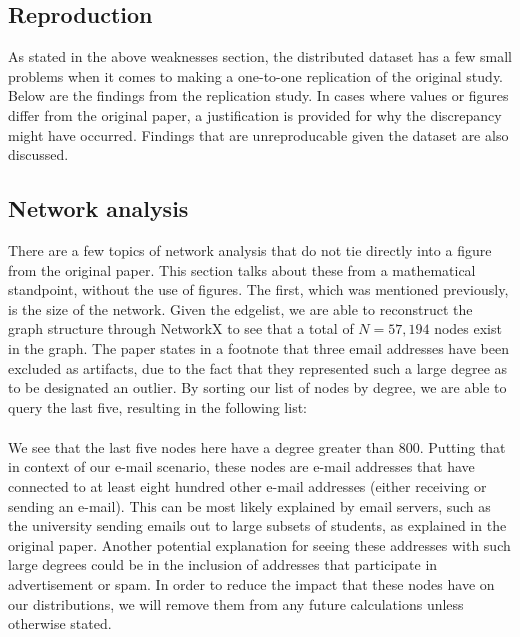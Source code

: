 \documentclass[11pt]{article}
\begin{document}
\begin{multicols}{2}
\section{Reproduction}
\hspace*{\parindent}As stated in the above weaknesses section, the distributed dataset has a few small problems when it comes to making a one-to-one replication of the original study. Below are the findings from the replication study. In cases where values or figures differ from the original paper, a justification is provided for why the discrepancy might have occurred. Findings that are unreproducable given the dataset are also discussed. 

\subsection{Network analysis}
\hspace*{\parindent}There are a few topics of network analysis that do not tie directly into a figure from the original paper. This section talks about these from a mathematical standpoint, without the use of figures. The first, which was mentioned previously, is the size of the network. Given the edgelist, we are able to reconstruct the graph structure through NetworkX to see that a total of \(N = 57,194\) nodes exist in the graph. The paper states in a footnote that three email addresses have been excluded as artifacts, due to the fact that they represented such a large degree as to be designated an outlier. By sorting our list of nodes by degree, we are able to query the last five, resulting in the following list:
\begin{align*}
[('13498', 802), ('11798', 1020), ('13678', 1228), \\('11028', 4171), ('32199', 6553)]
\end{align*}

We see that the last five nodes here have a degree greater than \(800\). Putting that in context of our e-mail scenario, these nodes are e-mail addresses that have connected to at least eight hundred other e-mail addresses (either receiving or sending an e-mail). This can be most likely explained by email servers, such as the university sending emails out to large subsets of students, as explained in the original paper. Another potential explanation for seeing these addresses with such large degrees could be in the inclusion of addresses that participate in advertisement or spam. In order to reduce the impact that these nodes have on our distributions, we will remove them from any future calculations unless otherwise stated.


\end{multicols}
\end{document}
